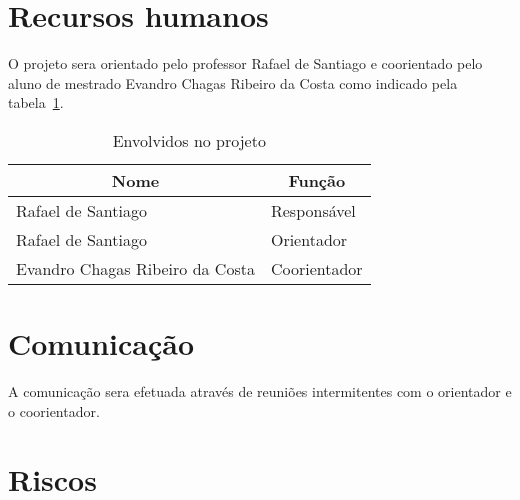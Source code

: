 \documentclass[
  12pt,
  openright,
  twoside,
  a4paper,
  english,
  brazil
]{abntex2}
\begin{document}
\section{Recursos humanos}\label{cap:recursos_humanos}

O projeto sera orientado pelo professor Rafael de Santiago e coorientado pelo aluno de mestrado Evandro Chagas Ribeiro da Costa como indicado pela tabela~\ref{tab:envolvidos}.

\begin{table}[h]
  \caption{Envolvidos no projeto}\label{tab:envolvidos}
    \centering
      \begin{tabular}{@{}ll@{}}
        \toprule
        \multicolumn{1}{c}{Nome} & \multicolumn{1}{c}{Função} \\
        \midrule
        Rafael de Santiago & Responsável \\
        Rafael de Santiago & Orientador \\
        Evandro Chagas Ribeiro da Costa & Coorientador \\
        \bottomrule
      \end{tabular}
\end{table}

\section{Comunicação}\label{cap:comunicacao}

A comunicação sera efetuada através de reuniões intermitentes com o orientador e o coorientador.

\section{Riscos}\label{cap:riscos}

\begin{table}[h]
  \caption{Riscos do projeto}\label{tab:riscos}
\end{table}

\postextual{}


\end{document}
